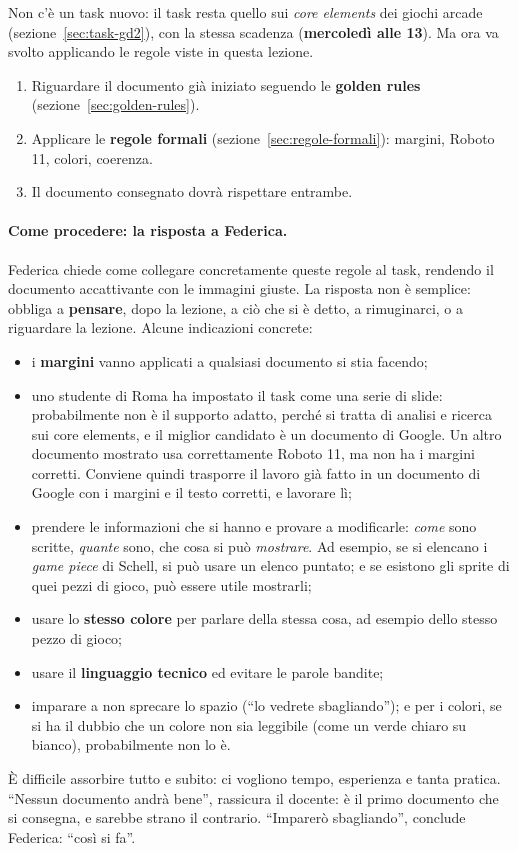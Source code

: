 Non c'è un task nuovo: il task resta quello sui \emph{core elements} dei
giochi arcade (sezione~\ref{sec:task-gd2}), con la stessa scadenza
(\textbf{mercoledì alle 13}). Ma ora va svolto applicando le regole viste in
questa lezione.
\begin{enumerate}
  \item Riguardare il documento già iniziato seguendo le \textbf{golden rules}
        (sezione~\ref{sec:golden-rules}).
  \item Applicare le \textbf{regole formali} (sezione~\ref{sec:regole-formali}):
        margini, Roboto 11, colori, coerenza.
  \item Il documento consegnato dovrà rispettare entrambe.
\end{enumerate}

\paragraph{Come procedere: la risposta a Federica.} Federica chiede come
collegare concretamente queste regole al task, rendendo il documento
accattivante con le immagini giuste. La risposta non è semplice: obbliga a
\textbf{pensare}, dopo la lezione, a ciò che si è detto, a rimuginarci, o a
riguardare la lezione. Alcune indicazioni concrete:
\begin{itemize}
  \item i \textbf{margini} vanno applicati a qualsiasi documento si stia
        facendo;
  \item uno studente di Roma ha impostato il task come una serie di slide:
        probabilmente non è il supporto adatto, perché si tratta di analisi e
        ricerca sui core elements, e il miglior candidato è un documento di
        Google. Un altro documento mostrato usa correttamente Roboto 11, ma non
        ha i margini corretti. Conviene quindi trasporre il lavoro già fatto
        in un documento di Google con i margini e il testo corretti, e
        lavorare lì;
  \item prendere le informazioni che si hanno e provare a modificarle:
        \emph{come} sono scritte, \emph{quante} sono, che cosa si può
        \emph{mostrare}. Ad esempio, se si elencano i \emph{game piece} di
        Schell, si può usare un elenco puntato; e se esistono gli sprite di
        quei pezzi di gioco, può essere utile mostrarli;
  \item usare lo \textbf{stesso colore} per parlare della stessa cosa, ad
        esempio dello stesso pezzo di gioco;
  \item usare il \textbf{linguaggio tecnico} ed evitare le parole bandite;
  \item imparare a non sprecare lo spazio (``lo vedrete sbagliando''); e per i
        colori, se si ha il dubbio che un colore non sia leggibile (come un
        verde chiaro su bianco), probabilmente non lo è.
\end{itemize}
È difficile assorbire tutto e subito: ci vogliono tempo, esperienza e tanta
pratica. ``Nessun documento andrà bene'', rassicura il docente: è il primo
documento che si consegna, e sarebbe strano il contrario. ``Imparerò
sbagliando'', conclude Federica: ``così si fa''.

